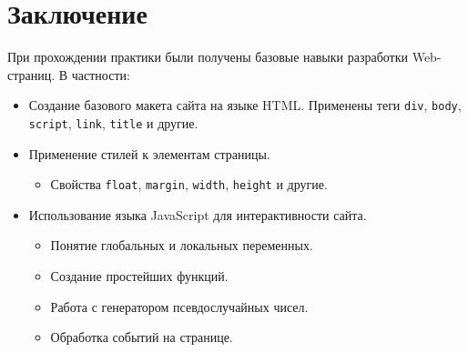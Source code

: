 \section{Заключение}

При прохождении практики были получены базовые навыки разработки Web-страниц. В частности:

\begin{itemize}

\item{Создание базового макета сайта на языке HTML. Применены теги \verb|div|, \verb|body|, \verb|script|, \verb|link|, \verb|title| и другие.}

\item{Применение стилей к элементам страницы.}
  \begin{itemize}
    \item{Свойства \verb|float|, \verb|margin|, \verb|width|, \verb|height| и другие.}
  \end{itemize}

\item{Использование языка JavaScript для интерактивности сайта.}
  \begin{itemize}
  \item{Понятие глобальных и локальных переменных.}
  \item{Создание простейших функций.}
  \item{Работа с генератором псевдослучайных чисел.}
  \item{Обработка событий на странице.}
  \end{itemize}
\end{itemize}

\pagebreak
